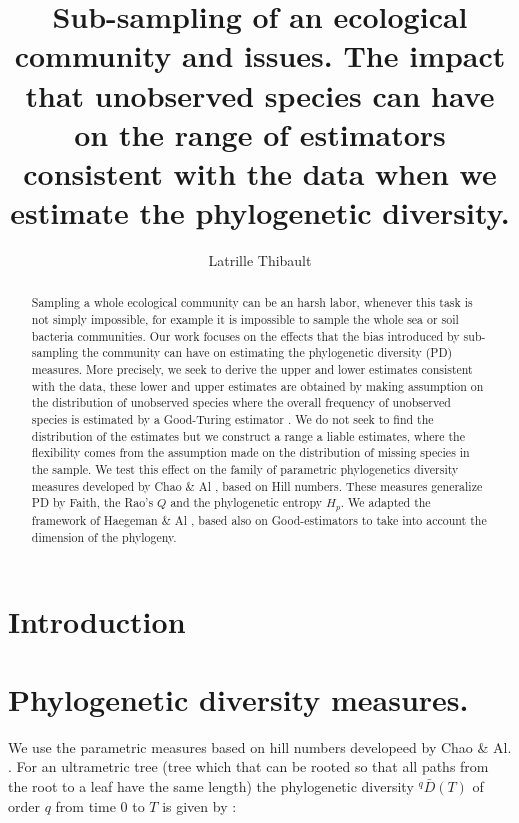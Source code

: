 \documentclass{article}
\author{Latrille Thibault}
\title{Sub-sampling of an ecological community and issues. The impact that unobserved species can have on the range of estimators consistent with the data when we estimate the phylogenetic diversity.}
\begin{document}
\maketitle 

\begin{abstract}

Sampling a whole ecological community can be an harsh labor, whenever this task is not simply impossible, for example it is impossible to sample the whole sea or soil bacteria communities. 
Our work focuses on the effects that the bias introduced by sub-sampling the community can have on estimating the phylogenetic diversity (PD) measures.
More precisely, we seek to derive the upper and lower estimates consistent with the data, these lower and upper estimates are obtained by making assumption on the distribution of unobserved species where the overall frequency of unobserved species is estimated by a Good-Turing estimator \cite{Good1953}. 
We do not seek to find the distribution of the estimates but we construct a range a liable estimates, where the flexibility comes from the assumption made on the distribution of missing species in the sample.
We test this effect on the family of parametric phylogenetics diversity measures developed by Chao \& Al \cite{Chao2010}, based on Hill numbers.
These measures generalize PD by Faith, the Rao's $Q$ and the phylogenetic entropy $H_p$.
We adapted the framework of Haegeman \& Al \cite{Haegeman2013}, based also on Good-estimators to take into account the dimension of the phylogeny.

\end{abstract}

\newpage

\section{Introduction}               


\section{Phylogenetic diversity measures.} 

We use the parametric measures based on hill numbers developeed by Chao \& Al. \cite{Chao2010}. 
For an ultrametric tree (tree which that can be rooted so that all paths from the root to a leaf have the same length) the phylogenetic diversity $ ^q \bar{D} (T)$ of order $q$ from time $0$ to $T$ is given by :
\end{document}
